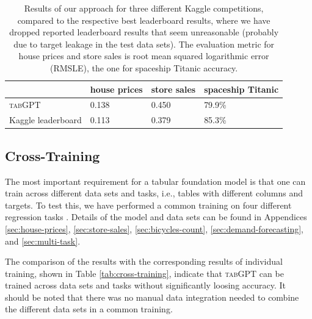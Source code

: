 \documentclass{article}
\begin{document}
\begin{table}
 \caption{Results of our approach for three different Kaggle competitions, compared to the respective best leaderboard results, where we have dropped reported leaderboard results that seem unreasonable (probably due to target leakage in the test data sets). The evaluation metric for house prices \cite{house-prices} and store sales \cite{store-sales} is root mean squared logarithmic error (RMSLE), the one for spaceship Titanic \cite{spaceship-titanic} accuracy.}
  \centering
  \begin{tabular}{llll}
    \toprule
     & house prices & store sales & spaceship Titanic \\
    \midrule
    \textsc{tabGPT} & 0.138 & 0.450 & 79.9\% \\
    Kaggle leaderboard & 0.113 & 0.379 & 85.3\% \\
    \bottomrule
  \end{tabular}
  \label{tab:Kaggle_comp}
\end{table}

\subsection{Cross-Training}
\label{sec:cross-training}
The most important requirement for a tabular foundation model is that one can train across different data sets and tasks, i.e., tables with different columns and targets. To test this, we have performed a common training on four different regression tasks \cite{house-prices,store-sales,bicycles-count,demand-forecasting}. Details of the model and data sets can be found in Appendices \ref{sec:house-prices}, \ref{sec:store-sales}, \ref{sec:bicycles-count}, \ref{sec:demand-forecasting}, and \ref{sec:multi-task}.

The comparison of the results with the corresponding results of individual training, shown in Table \ref{tab:cross-training}, indicate that \textsc{tabGPT} can be trained across data sets and tasks without significantly loosing accuracy. It should be noted that there was no manual data integration needed to combine the different data sets in a common training.
\end{document}
